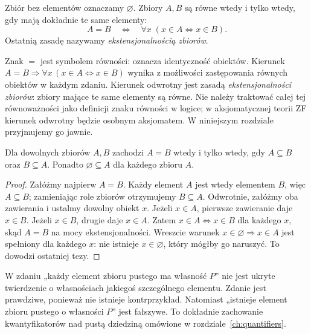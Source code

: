 \begin{definicja}
Zbiór bez elementów oznaczamy $\varnothing$. Zbiory $A,B$ są równe
wtedy i tylko wtedy, gdy mają dokładnie te same elementy:
\[
A=B\quad\Longleftrightarrow\quad
\forall x\;(x\in A\Longleftrightarrow x\in B).
\]
Ostatnią zasadę nazywamy \emph{ekstensjonalnością zbiorów}.
\end{definicja}

\begin{uwaga}\label{rem:equality-extensionality-xlii}
Znak $=$ jest symbolem równości: oznacza identyczność obiektów.
Kierunek $A=B\Rightarrow\forall x\,(x\in A\Leftrightarrow x\in B)$
wynika z możliwości zastępowania równych obiektów w każdym zdaniu.
Kierunek odwrotny jest zasadą \emph{ekstensjonalności zbiorów}:
zbiory mające te same elementy są równe. Nie należy traktować
całej tej równoważności jako definicji znaku równości w logice;
w aksjomatycznej teorii ZF kierunek odwrotny będzie osobnym
aksjomatem. W niniejszym rozdziale przyjmujemy go jawnie.
\end{uwaga}

\begin{twierdzenie}\label{thm:two-inclusions}
Dla dowolnych zbiorów $A,B$ zachodzi
$A=B$ wtedy i tylko wtedy, gdy $A\subseteq B$ oraz $B\subseteq A$.
Ponadto $\varnothing\subseteq A$ dla każdego zbioru $A$.
\end{twierdzenie}
\begin{proof}
Załóżmy najpierw $A=B$. Każdy element $A$ jest wtedy elementem
$B$, więc $A\subseteq B$; zamieniając role zbiorów otrzymujemy
$B\subseteq A$. Odwrotnie, załóżmy oba zawierania i ustalmy
dowolny obiekt $x$. Jeżeli $x\in A$, pierwsze zawieranie daje
$x\in B$. Jeżeli $x\in B$, drugie daje $x\in A$. Zatem
$x\in A\Longleftrightarrow x\in B$ dla każdego $x$, skąd $A=B$
na mocy ekstensjonalności. Wreszcie warunek
$x\in\varnothing\Longrightarrow x\in A$ jest spełniony dla
każdego $x$: nie istnieje $x\in\varnothing$, który mógłby go
naruszyć. To dowodzi ostatniej tezy.
\end{proof}

\begin{uwaga}
W zdaniu „każdy element zbioru pustego ma własność $P$” nie jest
ukryte twierdzenie o własnościach jakiegoś szczególnego elementu.
Zdanie jest prawdziwe, ponieważ nie istnieje kontrprzykład.
Natomiast „istnieje element zbioru pustego o własności $P$” jest
fałszywe. To dokładnie zachowanie kwantyfikatorów nad pustą dziedziną
omówione w rozdziale~\ref{ch:quantifiers}.
\end{uwaga}


